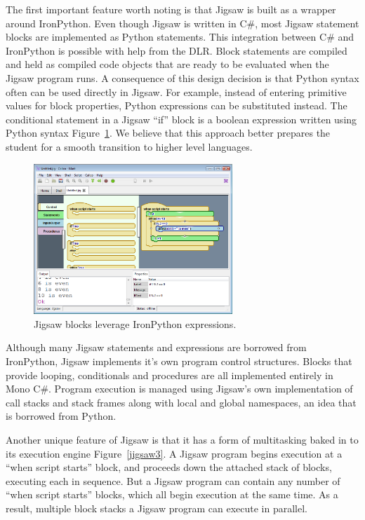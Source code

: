 \documentclass[preprint]{sigplanconf}
\begin{document}
The first important feature worth noting is that Jigsaw is built as a
wrapper around IronPython. Even though Jigsaw is written in C\#, most
Jigsaw statement blocks are implemented as Python statements. This
integration between C\# and IronPython is possible with help from the
DLR. Block statements are compiled and held as compiled code objects
that are ready to be evaluated when the Jigsaw program runs. A
consequence of this design decision is that Python syntax often can be
used directly in Jigsaw. For example, instead of entering primitive
values for block properties, Python expressions can be substituted
instead. The conditional statement in a Jigsaw ``if'' block is a
boolean expression written using Python syntax Figure~\ref{jigsaw2}. We believe
that this approach better prepares the student for a smooth transition
to higher level languages.


\begin{figure}[h!]
  \centering
    \includegraphics[width=75mm]{jigsaw2.eps} 
  \caption{Jigsaw blocks leverage IronPython expressions.}
  \label{jigsaw2}
\end{figure}

Although many Jigsaw statements and expressions are borrowed from
IronPython, Jigsaw implements it’s own program control
structures. Blocks that provide looping, conditionals and procedures
are all implemented entirely in Mono C\#. Program execution is managed
using Jigsaw’s own implementation of call stacks and stack frames
along with local and global namespaces, an idea that is borrowed from
Python.

Another unique feature of Jigsaw is that it has a form of multitasking
baked in to its execution engine Figure~\ref{jigsaw3}. A Jigsaw program begins
execution at a ``when script starts'' block, and proceeds down the
attached stack of blocks, executing each in sequence. But a Jigsaw
program can contain any number of ``when script starts'' blocks, which
all begin execution at the same time. As a result, multiple block
stacks a Jigsaw program can execute in parallel.
\end{document}
